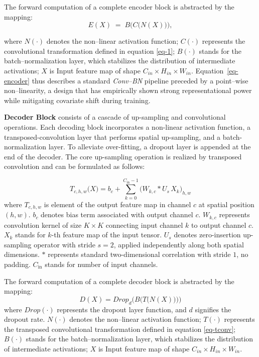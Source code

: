 \documentclass[a4paper, times, 10pt,twocolumn]{article}
\begin{document}
The forward computation of a complete encoder block is abstracted by the mapping:
\begin{equation}
	\label{eq-encoder}
	E(X) \;=\; B\!\bigl(C\!\bigl(N(X)\bigr)\bigr),
\end{equation}

where
$N(\cdot)$ denotes the non--linear activation function;
$C(\cdot)$ represents the convolutional transformation defined in equation \eqref{eq-1};
$B(\cdot)$ stands for the batch--normalization layer, which stabilizes the distribution of intermediate activations;
$X$ is Input feature map of shape $C_{in} \times H_{in} \times W_{in}$.
Equation~\eqref{eq-encoder} thus describes a standard \emph{Conv--BN} pipeline preceded by a point--wise non--linearity, a design that has empirically shown strong representational power while mitigating covariate shift during training.

\textbf{Decoder Block} consists of a cascade of up-sampling and convolutional operations.
Each decoding block incorporates a non-linear activation function, a transposed-convolution layer that performs spatial up-sampling, and a batch-normalization layer.
To alleviate over-fitting, a dropout layer is appended at the end of the decoder.
The core up-sampling operation is realized by transposed convolution and can be formulated as follows:

\begin{equation}
	\label{eq-tconv}
	T_{c,h,w} \bigl( X \bigr) = b_{c} + \sum_{k=0}^{C_{\mathrm{in}}-1} \bigl( W_{k,c}*U_{s}\,X_{k} \bigr)_{h,w}
\end{equation}
where $T_{c,h,w}$ is element of the output feature map in channel $c$ at spatial position $(h,w)$.
$b_{c}$ denotes bias term associated with output channel $c$.
$W_{k,c}$ represents convolution kernel of size $K\times K$ connecting input channel $k$ to output channel $c$.
$X_{k}$ stands for $k$-th feature map of the input tensor.
$U_{s}$ denotes zero-insertion up-sampling operator with stride $s=2$, applied independently along both spatial dimensions.
$*$ represents standard two-dimensional correlation with stride $1$, no padding.
$C_{\mathrm{in}}$ stands for number of input channels.

The forward computation of a complete decoder block is abstracted by the mapping:
\begin{equation}
	\label{eq-decoder}
	D(X) = Drop_{d}\bigl( B \bigl( T \bigl( N(X) \bigr) \bigr) \bigr)
\end{equation}
where 
$Drop(\cdot)$ represents the dropout layer function, and $d$ signifies the dropout rate.
$N(\cdot)$ denotes the non--linear activation function;
$T(\cdot)$ represents the transposed convolutional transformation defined in equation \eqref{eq-tconv};
$B(\cdot)$ stands for the batch--normalization layer, which stabilizes the distribution of intermediate activations;
$X$ is Input feature map of shape $C_{in} \times H_{in} \times W_{in}$.
\end{document}
